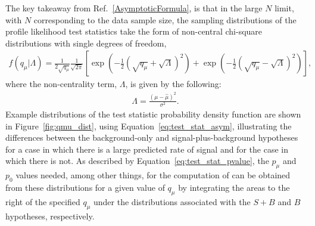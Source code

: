 The key takeaway from Ref.~\ref{AsymptoticFormula}, is that in the large $N$ limit, with $N$
corresponding to the data sample size, the sampling distributions of the profile likelihood test statistics
take the form of non-central chi-square distributions with single degrees of freedom,
\begin{align}
    f(q_{\mu} | \Lambda) = \frac{1}{2\sqrt{q_{\mu}}} \frac{1}{\sqrt{2\pi}} \left[ \exp \left( -\frac{1}{2} (\sqrt{q_{\mu}} + \sqrt{\Lambda})^2 \right) 
        + \exp \left( -\frac{1}{2}(\sqrt{q_{\mu}} - \sqrt{\Lambda} )^2 \right) \right],
    \label{eq:test_stat_asym}
\end{align}
where the non-centrality term, $\Lambda$, is given by the following:
\begin{align}
    \Lambda = \frac{ (\mu - \hat{\mu})^2 } {\sigma^2}.
    \label{eq:noncentrality}
\end{align}
Example distributions of the test statistic probability density function are shown in Figure~\ref{fig:qmu_dist},
using Equation~\ref{eq:test_stat_asym}, illustrating the differences between the background-only
and signal-plus-background hypotheses for a case in which there is a large predicted rate of signal
and for the case in which there is not.
As described by Equation~\ref{eq:test_stat_pvalue}, the $p_{\mu}$ and $p_0$ values needed, among other things, for the computation of \cls can be obtained from these distributions
for a given value of $q_{\mu}$ by integrating the areas to the right of the specified $q_{\mu}$ under the distributions associated
with the $S+B$ and $B$ hypotheses, respectively.

